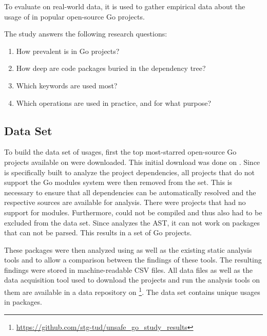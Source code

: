 To evaluate \toolGeiger{} on real-world data, it is used to gather empirical data about the usage of \unsafe{} in
popular open-source Go projects.

The study answers the following research questions:

\begin{enumerate}[left=0.5cm, label={RQ\arabic*}]
    \item How prevalent is \unsafe{} in Go projects? \label{rq:prevalApp}
    \item How deep are \unsafe{} code packages buried in the dependency tree? \label{rq:depsDepth}
    \item Which \unsafe{} keywords are used most? \label{rq:distTypes}
    \item Which \unsafe{} operations are used in practice, and for what purpose? \label{rq:purpose}
\end{enumerate}



\subsection{Data Set}\label{subsec:go-geiger:evaluation:data-set}

To build the data set of \unsafe{} usages, first the top \projsTotal{} most-starred open-source Go projects available on
\github{} were downloaded.
This initial download was done on .
Since \toolGeiger{} is specifically built to analyze the project dependencies, all projects that do not support the Go
modules system were then removed from the set.
This is necessary to ensure that all dependencies can be automatically resolved and the respective sources are available
for analysis.
There were \projsWithoutModules{} projects that had no support for modules.
Furthermore, \projsNotCompiled{} could not be compiled and thus also had to be excluded from the data set.
Since \toolGeiger{} analyzes the \acrshort{AST}, it can not work on packages that can not be parsed.
This results in a set of \projsAnalyzed{} Go projects.

These packages were then analyzed using \toolGeiger{} as well as the existing static analysis tools \toolVet{} and
\toolGosec{} to allow a comparison between the findings of these tools.
The resulting findings were stored in machine-readable \acrshort{CSV} files.
All data files as well as the data acquisition tool used to download the projects and run the analysis tools on them
are available in a data repository on \github{}\footnote{\url{https://github.com/stg-tud/unsafe_go_study_results}}.
The data set contains  unique \unsafe{} usages in \packagesAnalyzed{} packages.


